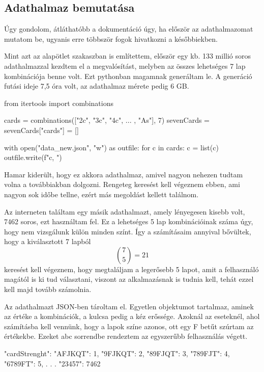 \subsection{Adathalmaz bemutatása}
Úgy gondolom, átláthatóbb a dokumentáció úgy, ha először az adathalmazomat mutatom be, ugyanis erre többször fogok hivatkozni a későbbiekben. 

Mint azt az alapötlet szakaszban is említettem, először egy kb. 133 millió soros adathalmazzal kezdtem el a megvalósítást, melyben az összes lehetséges 7 lap kombinációja benne volt. Ezt pythonban magamnak generáltam le. A generáció futási ideje 7,5 óra volt, az adathalmaz mérete pedig 6 GB.

\begin{python}
from itertools import combinations

cards = combinations(["2c", "3c", "4c", ... , "As"], 7)
sevenCards = {}
sevenCards["cards"] = []

with open("data_new.json", "w") as outfile:
    for c in cards:
        c = list(c)
        outfile.write(f"{c}, \n")
\end{python}

Hamar kiderült, hogy ez akkora adathalmaz, amivel nagyon nehezen tudtam volna a továbbiakban dolgozni. Rengeteg keresést kell végeznem ebben, ami nagyon sok időbe tellne, ezért más megoldást kellett találnom.

Az interneten találtam egy másik adathalmazt, amely lényegesen kisebb volt, 7462 soros, ezt használtam fel. 
\cite{chances}
Ez a lehetséges 5 lap kombinációinak száma úgy, hogy nem vizsgálunk külön minden színt. Így a számításaim annyival bővültek, hogy a kiválasztott 7 lapból \[ \binom{7}{5}=21\] keresést kell végeznem, hogy megtaláljam a legerősebb 5 lapot, amit a felhasználó magától is ki tud választani, viszont az alkalmazásnak is tudnia kell, tehát ezzel kell majd tovább számolnia.

Az adathalmazt JSON-ben tároltam el. Egyetlen objektumot tartalmaz, aminek az értéke a kombinációk, a kulcsa pedig a kéz erőssége. Azoknál az eseteknél, ahol számításba kell vennünk, hogy a lapok színe azonos, ott egy F betűt szúrtam az értékekbe. Ezeket abc sorrendbe rendeztem az egyszerűbb felhasználás végett.

\begin{python}
{
  "cardStrenght": {
    "AFJKQT": 1,
    "9FJKQT": 2,
    "89FJQT": 3,
    "789FJT": 4,
    "6789FT": 5,
    .
    .
    .
    "23457": 7462
    }
}
\end{python}

